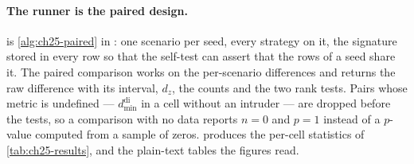 \paragraph{The runner is the paired design.}
 is \cref{alg:ch25-paired} in \python: one scenario
per seed, every strategy on it, the signature stored in every row so that
the self-test can assert that the rows of a seed share it. The paired
comparison works on the per-scenario differences and returns the raw
difference with its interval, $d_z$, the counts and the two rank tests.
Pairs whose metric is undefined --- $d_{\min}^{\mathrm{di}}$ in a cell without
an intruder --- are dropped before the tests, so a comparison with no data
reports $n = 0$ and $p = 1$ instead of a $p$-value computed from a sample of
zeros.  produces the per-cell statistics of
\cref{tab:ch25-results}, and  the plain-text tables the
figures read.


